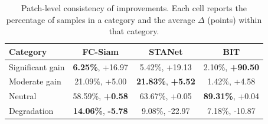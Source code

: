 \begin{table}[t]
  \centering
  \caption{Patch-level consistency of \cosa{} improvements. Each cell reports the percentage of samples in a category and the average $\Delta$\Fonec{} (points) within that category.}
  \label{tab:consistency}
  \setlength{\tabcolsep}{10pt}
  \renewcommand{\arraystretch}{1.05}
  \small
  \begin{tabular}{l c c c}
    \toprule
    Category & FC-Siam & STANet & BIT \\
    \midrule
    Significant gain & \textbf{6.25\%}, +16.97 & 5.42\%, +19.13 & 2.10\%, \textbf{+90.50} \\
    Moderate gain & 21.09\%, +5.00 & \textbf{21.83\%}, \textbf{+5.52} & 1.42\%, +4.58 \\
    Neutral & 58.59\%, \textbf{+0.58} & 63.67\%, +0.05 & \textbf{89.31\%}, +0.04 \\
    Degradation & \textbf{14.06\%}, \textbf{-5.78} & 9.08\%, -22.97 & 7.18\%, -10.87 \\
    \bottomrule
  \end{tabular}
\end{table}
